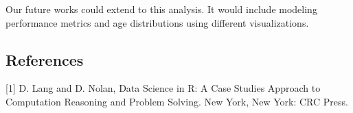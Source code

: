 \documentclass[11pt]{article}
\begin{document}
Our future works could extend to this analysis. It would include
modeling performance metrics and age distributions using different
visualizations.

    \subsection{References}\label{references}

{[}1{]} D. Lang and D. Nolan, Data Science in R: A Case Studies Approach
to Computation Reasoning and Problem Solving. New York, New York: CRC
Press.


    
    
    
    
\end{document}
